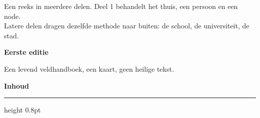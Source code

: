 \begin{titlepage}
\vfill

{\sffamily\footnotesize\color{softblack!60}
Een reeks in meerdere delen. Deel 1 behandelt het thuis, een persoon en een node.\\
Latere delen dragen dezelfde methode naar buiten: de school, de universiteit, de stad.\par}
\vspace{16pt minus 6pt}
{\sffamily\small\color{accentlt}\textbf{Eerste editie}\par}
\vspace{4pt minus 1pt}
{\sffamily\footnotesize\color{softblack!55} Een levend veldhandboek, een kaart, geen heilige tekst.\par}
\vspace{1.0cm minus 0.7cm}
\end{titlepage}

\setcounter{page}{2}

\clearpage
\thispagestyle{plain}
{\sffamily\Large\bfseries\color{accent}Inhoud\par}\vspace{6pt}
{\color{rulegray}\hrule height 0.8pt}\vspace{10pt}
\makeatletter
{}
\makeatother
\clearpage
